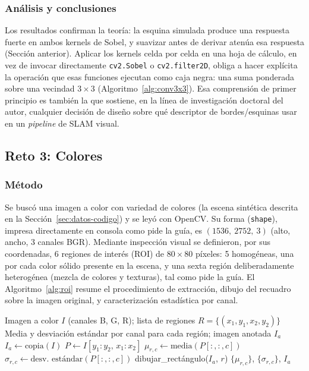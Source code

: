 \documentclass[11pt]{article}
\begin{document}
\subsubsection{Análisis y conclusiones}
Los resultados confirman la teoría: la esquina simulada produce una
respuesta fuerte en ambos kernels de Sobel, y suavizar antes de derivar
atenúa esa respuesta (Sección anterior). Aplicar los kernels celda por
celda en una hoja de cálculo, en vez de invocar directamente
\texttt{cv2.Sobel} o \texttt{cv2.filter2D}, obliga a hacer explícita la
operación que esas funciones ejecutan como caja negra: una suma ponderada
sobre una vecindad $3\times 3$ (Algoritmo~\ref{alg:conv3x3}). Esa
comprensión de primer principio es también la que sostiene, en la línea de
investigación doctoral del autor, cualquier decisión de diseño sobre qué
descriptor de bordes/esquinas usar en un \emph{pipeline} de SLAM visual.

\subsection{Reto 3: Colores}
\label{sec:reto3}

\subsubsection{Método}
Se buscó una imagen a color con variedad de colores (la escena sintética
descrita en la Sección~\ref{sec:datos-codigo}) y se leyó con OpenCV. Su
forma (\texttt{shape}), impresa directamente en consola como pide la guía,
es $(1536,\ 2752,\ 3)$ (alto, ancho, 3 canales BGR). Mediante inspección
visual se definieron, por sus coordenadas, 6 regiones de interés (ROI) de
$80\times 80$ píxeles: 5 homogéneas, una por cada color sólido presente en
la escena, y una sexta región deliberadamente heterogénea (mezcla de
colores y texturas), tal como pide la guía. El Algoritmo~\ref{alg:roi}
resume el procedimiento de extracción, dibujo del recuadro sobre la imagen
original, y caracterización estadística por canal.

\begin{algorithm}
\caption{Extracción y caracterización estadística de regiones de interés}
\label{alg:roi}
\begin{algorithmic}[1]
\Require Imagen a color $I$ (canales B, G, R); lista de regiones $R = \{(x_1,y_1,x_2,y_2)\}$
\Ensure Media y desviación estándar por canal para cada región; imagen anotada $I_a$
\State $I_a \gets \text{copia}(I)$
    \State $P \gets I[y_1{:}y_2,\, x_1{:}x_2]$ 
        \State $\mu_{r,c} \gets \text{media}(P[:,:,c])$
        \State $\sigma_{r,c} \gets \text{desv.\ estándar}(P[:,:,c])$
    \EndFor
    \State dibujar\_rectángulo($I_a$, $r$)
\EndFor
\State \Return $\{\mu_{r,c}\}$, $\{\sigma_{r,c}\}$, $I_a$
\end{algorithmic}
\end{algorithm}
\end{document}
